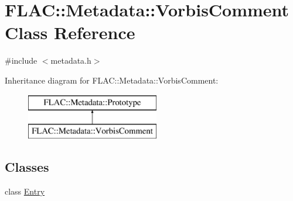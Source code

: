 \hypertarget{class_f_l_a_c_1_1_metadata_1_1_vorbis_comment}{}\section{F\+L\+AC\+:\+:Metadata\+:\+:Vorbis\+Comment Class Reference}
\label{class_f_l_a_c_1_1_metadata_1_1_vorbis_comment}


{\ttfamily \#include $<$metadata.\+h$>$}

Inheritance diagram for F\+L\+AC\+:\+:Metadata\+:\+:Vorbis\+Comment\+:\begin{figure}[H]
\begin{center}
\leavevmode
\includegraphics[height=2.000000cm]{class_f_l_a_c_1_1_metadata_1_1_vorbis_comment}
\end{center}
\end{figure}
\subsection*{Classes}
\begin{DoxyCompactItemize}
\item 
class \hyperlink{class_f_l_a_c_1_1_metadata_1_1_vorbis_comment_1_1_entry}{Entry}
\end{DoxyCompactItemize}
